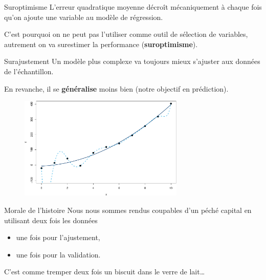 \documentclass[
  ignorenonframetext,
]{beamer}
\providecommand{\tightlist}{%
  \setlength{\itemsep}{0pt}\setlength{\parskip}{0pt}}\usepackage{longtable,booktabs,array}
\begin{document}
\begin{frame}{Suroptimisme}
\protect\hypertarget{suroptimisme}{}
L'erreur quadratique moyenne décroît mécaniquement à chaque fois qu'on
ajoute une variable au modèle de régression.

C'est pourquoi on ne peut pas l'utiliser comme outil de sélection de
variables, autrement on va surestimer la performance
(\textbf{suroptimisme}).
\end{frame}

\begin{frame}{Surajustement}
\protect\hypertarget{surajustement}{}
Un modèle plus complexe va toujours mieux s'ajuster aux données de
l'échantillon.

En revanche, il se \textbf{généralise} moins bien (notre objectif en
prédiction).

\begin{figure}

{\centering \includegraphics[width=0.7\textwidth,height=\textheight]{MATH60602-diapos4_files/figure-beamer/overfitting-1.pdf}

}

\end{figure}
\end{frame}

\begin{frame}{Morale de l'histoire}
\protect\hypertarget{morale-de-lhistoire}{}
Nous nous sommes rendus coupables d'un péché capital en utilisant deux
fois les données

\begin{itemize}
\tightlist
\item
  une fois pour l'ajustement,
\item
  une fois pour la validation.
\end{itemize}

C'est comme tremper deux fois un biscuit dans le verre de lait\ldots{}
\end{frame}
\end{document}
